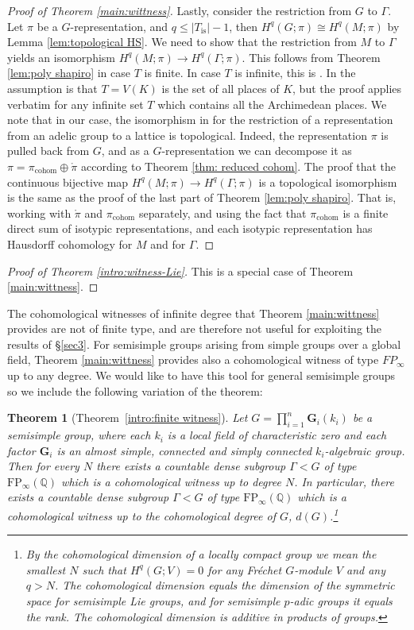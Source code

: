 \documentclass[12pt,reqno]{amsart}
\newcommand{\Q}{\mathbb{Q}}
\newtheorem{theorem}{Theorem}[section]
\theoremstyle{definition}
\newcommand{\abs}[1]{\left| #1 \right|}
\begin{document}
\begin{proof}[Proof of Theorem \ref{main:wittness}]
    Lastly, consider the restriction from $G$ to $\Gamma$. Let $\pi$ be a $G$-representation, and $q \leq \abs{T_\mathrm{is}} - 1$, then $H^q(G;\pi) \cong H^q(M ; \pi)$ by Lemma \ref{lem:topological HS}. We need to show that the restriction from $M$ to $\Gamma$ yields an isomorphism $H^q(M;\pi) \to H^q(\Gamma ; \pi)$. This follows from Theorem \ref{lem:poly shapiro} in case $T$ is finite. In case $T$ is infinite, this is \cite[Theorem~E]{BaderSauer}. In \cite{BaderSauer} the assumption is that $T=V(K)$ is the set of all places of $K$, but the proof applies verbatim for any infinite set $T$ which contains all the Archimedean places. We note that in our case, the isomorphism in \cite[Theorem~E]{BaderSauer} for the restriction of a representation from an adelic group to a lattice is topological. Indeed, the representation $\pi$ is pulled back from $G$, and as a $G$-representation we can decompose it as $\pi=\pi_\mathrm{cohom} \oplus \mathring\pi$ according to Theorem \ref{thm: reduced cohom}. The proof that the continuous bijective map $H^q(M;\pi) \to H^q(\Gamma;\pi)$ is a topological isomorphism is the same as the proof of the last part of Theorem \ref{lem:poly shapiro}. That is, working with $\mathring \pi$ and $\pi_\mathrm{cohom}$ separately, and using the fact that $\pi_\mathrm{cohom}$ is a finite direct sum of isotypic representations, and each isotypic representation has Hausdorff cohomology for $M$ and for $\Gamma$.
\end{proof}
\begin{proof}[Proof of Theorem \ref{intro:witness-Lie}]
    This is a special case of Theorem \ref{main:wittness}.
\end{proof}
The cohomological witnesses of infinite degree that Theorem \ref{main:wittness} provides are not of finite type, and are therefore not useful for exploiting the results of \S\ref{sec3}. For semisimple groups arising from simple groups over a global field, Theorem \ref{main:wittness} provides also a cohomological witness of type $FP_\infty$ up to any degree. We would like to have this tool for general semisimple groups so we include the following variation of the theorem:
\begin{theorem}[Theorem~\ref{intro:finite witness}]\label{thm:witness exists}
    Let $G=\prod_{i=1}^n \mathbf{G}_i(k_i)$ be a semisimple group, where each $k_i$ is a local field of characteristic zero and each factor $\mathbf{G}_i$ is an almost simple, connected and simply connected $k_i$-algebraic group. Then for every $N$ there exists a countable dense subgroup $\Gamma<G$ of type $\mathrm{FP}_\infty(\Q)$
    which is a cohomological witness up to degree $N$.
    In particular, there exists a countable dense subgroup $\Gamma<G$ of type $\mathrm{FP}_\infty(\Q)$
    which is a cohomological witness up to the cohomological degree of $G$, $d(G)$.\footnote{By the \textit{cohomological dimension} of a locally compact group we mean the smallest $N$ such that $H^q(G;V)=0$ for any Fr\'echet $G$-module $V$ and any $q>N$. The cohomological dimension equals the dimension of the symmetric space for semisimple Lie groups, and for semisimple $p$-adic groups it equals the rank. The cohomological dimension is additive in products of groups.}
\end{theorem}
\end{document}
